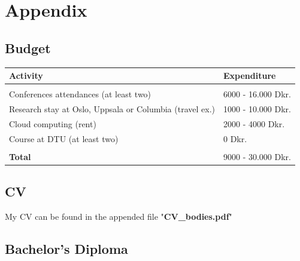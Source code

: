 \documentclass[a4paper]{article}
\begin{document}
\pagebreak
\section{Appendix}

\subsection{Budget}

\begin{center}
\begin{tabular}{  m{10cm} m{4cm} } 

	\hline
	\textbf{Activity}    & \textbf{Expenditure}\\
	\hline
	    &                               \\
	Conferences attendances (at least two)   & 6000 - 16.000 Dkr.                       \\
    Research stay at Oslo, Uppsala or Columbia (travel ex.)  & 1000 - 10.000 Dkr.				\\
	Cloud computing (rent)   & 2000 - 4000 Dkr.			                                \\
    Course at DTU (at least two) & 0 Dkr.			                                \\
 	    &                               \\
 	\hline
    \textbf{Total}       & 9000 - 30.000 Dkr.			    \\
    \hline

\end{tabular}
\end{center}


\pagebreak
\subsection{CV}

My CV can be found in the appended file "\textbf{CV\_bodies.pdf}"

\subsection{Bachelor's Diploma}
\end{document}
